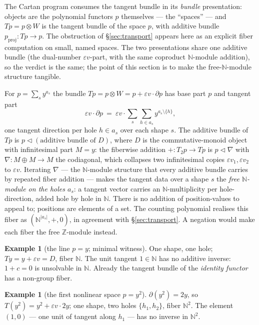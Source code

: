 \documentclass[11pt]{article}
\theoremstyle{definition}
\newtheorem{example}[theorem]{Example}
\newcommand{\N}{\mathbb{N}}
\newcommand{\Z}{\mathbb{Z}}
\begin{document}
The Cartan program consumes the tangent bundle in its \emph{bundle} presentation: objects
are the polynomial functors $p$ themselves --- the ``spaces'' --- and $Tp=p\otimes W$ is the
tangent bundle of the space $p$, with additive bundle $p_{\mathrm{proj}}:Tp\to p$. The
obstruction of \S\ref{sec:transport} appears here as an explicit fiber computation on
small, named spaces. The two presentations share one additive bundle (the dual-number
$\varepsilon v$-part, with the same coproduct $\N$-module addition), so the verdict is the
same; the point of this section is to make the free-$\N$-module structure tangible.

For $p=\sum_s y^{a_s}$ the bundle $Tp=p\otimes W = p+\varepsilon v\cdot\partial p$ has base
part $p$ and tangent part
\[
   \varepsilon v\cdot\partial p\ =\ \varepsilon v\cdot\sum_s\sum_{h\in a_s} y^{a_s\setminus\{h\}},
\]
one tangent direction per hole $h\in a_s$ over each shape $s$. The additive bundle of $Tp$
is $p\lhd(\text{additive bundle of }D)$, where $D$ is the commutative-monoid object with
infinitesimal part $M=y$: the fiberwise addition $+:T_2p\to Tp$ is $p\lhd\nabla$ with
$\nabla:M\oplus M\to M$ the codiagonal, which collapses two infinitesimal copies
$\varepsilon v_1,\varepsilon v_2$ to $\varepsilon v$. Iterating $\nabla$ --- the
$\N$-module structure that every additive bundle carries by repeated fiber addition ---
makes the tangent data over a shape $s$ the \emph{free $\N$-module on the holes $a_s$}: a
tangent vector carries an $\N$-multiplicity per hole-direction, added hole by hole in $\N$.
There is no addition of position-values to appeal to; positions are elements of a set. The
counting polynomial realises this fiber as $(\N^{|a_s|},+,0)$, in agreement with
\S\ref{sec:transport}. A negation would make each fiber the free $\Z$-module instead.

\begin{example}[the line $p=y$; minimal witness]
One shape, one hole; $Ty=y+\varepsilon v=D$, fiber $\N$. The unit tangent $1\in\N$ has no
additive inverse: $1+c=0$ is unsolvable in $\N$. Already the tangent bundle of the
\emph{identity functor} has a non-group fiber.
\end{example}

\begin{example}[the first nonlinear space $p=y^2$]
$\partial(y^2)=2y$, so $T(y^2)=y^2+\varepsilon v\cdot 2y$; one shape, two holes
$\{h_1,h_2\}$, fiber $\N^2$. The element $(1,0)$ --- one unit of tangent along $h_1$ --- has
no inverse in $\N^2$.
\end{example}
\end{document}
